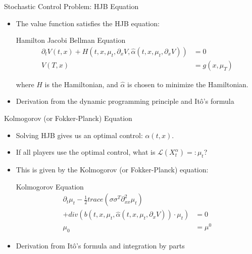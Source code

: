 \documentclass{beamer}
\begin{document}
	\begin{frame}{Stochastic Control Problem: HJB Equation}
		\begin{itemize}
			\item {
				The value function satisfies the HJB equation:
				\begin{block}{Hamilton Jacobi Bellman Equation}
					\begin{equation}
						\begin{split}
							\partial_tV(t,x)+ H(t,x, \mu_t,\partial_x V,\hat{\alpha}(t,x,\mu_t, \partial_x V))&=0 \\
							V(T,x)&=g(x,\mu_T)
						\end{split}
					\end{equation}
				\end{block}
				where  $H$ is the Hamiltonian, and $\hat{\alpha}$ is chosen to minimize the Hamiltonian.
			}
			\item {
				Derivation from the dynamic programming principle and It\^{o}'s formula
			}
		\end{itemize}
	\end{frame}
	
	\begin{frame}{Kolmogorov (or Fokker-Planck) Equation}
		\begin{itemize}
			\item {
				Solving HJB gives us an optimal control: $\alpha(t,x)$.
			}
			\item {
				If all players use the optimal control, what is $\mathcal{L}(X_t^{\alpha})=:\mu_t$?
			}
			\item {
				This is given by the Kolmogorov (or Fokker-Planck) equation:
				\begin{block}{Kolmogorov Equation}
					\begin{equation}
						\begin{split}
							\partial_t \mu_t-\frac{1}{2} trace(\sigma \sigma^T \partial_{xx}^2 \mu_t)& \\
							+ div(b(t,x, \mu_t,\hat{\alpha}(t,x,\mu_t, \partial_x V))\cdot \mu_t)&=0 \\
							\mu_0&= \mu^0   
						\end{split}
					\end{equation}
				\end{block}
			}
			\item {
				Derivation from It\^{o}'s formula and integration by parts
			}
		\end{itemize}
	\end{frame}
	
\end{document}
